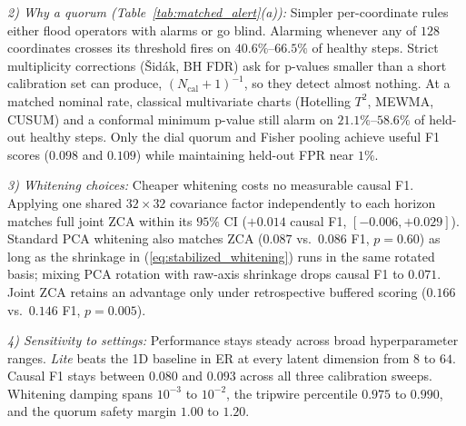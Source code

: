 \documentclass[journal]{IEEEtran}
\begin{document}
\noindent\emph{2) Why a quorum (Table~\ref{tab:matched_alert}(a)):} Simpler per-coordinate rules either flood operators with alarms or go blind. Alarming whenever any of $128$ coordinates crosses its threshold fires on $40.6\%\text{--}66.5\%$ of healthy steps. Strict multiplicity corrections (\v{S}id\'{a}k, BH FDR) ask for p-values smaller than a short calibration set can produce, $(N_{\text{cal}}+1)^{-1}$, so they detect almost nothing. At a matched nominal rate, classical multivariate charts (Hotelling $T^2$, MEWMA, CUSUM) and a conformal minimum p-value still alarm on $21.1\%\text{--}58.6\%$ of held-out healthy steps. Only the dial quorum and Fisher pooling achieve useful F1 scores ($0.098$ and $0.109$) while maintaining held-out FPR near $1\%$.

\noindent\emph{3) Whitening choices:} Cheaper whitening costs no measurable causal F1. Applying one shared $32\times 32$ covariance factor independently to each horizon matches full joint ZCA within its $95\%$ CI ($+0.014$ causal F1, $[-0.006, +0.029]$). Standard PCA whitening also matches ZCA ($0.087$ vs.\ $0.086$ F1, $p=0.60$) as long as the shrinkage in (\ref{eq:stabilized_whitening}) runs in the same rotated basis; mixing PCA rotation with raw-axis shrinkage drops causal F1 to $0.071$. Joint ZCA retains an advantage only under retrospective buffered scoring ($0.166$ vs.\ $0.146$ F1, $p=0.005$).

\noindent\emph{4) Sensitivity to settings:} Performance stays steady across broad hyperparameter ranges. \emph{Lite} beats the 1D baseline in ER at every latent dimension from $8$ to $64$. Causal F1 stays between $0.080$ and $0.093$ across all three calibration sweeps. Whitening damping spans $10^{-3}$ to $10^{-2}$, the tripwire percentile $0.975$ to $0.990$, and the quorum safety margin $1.00$ to $1.20$.
\end{document}
